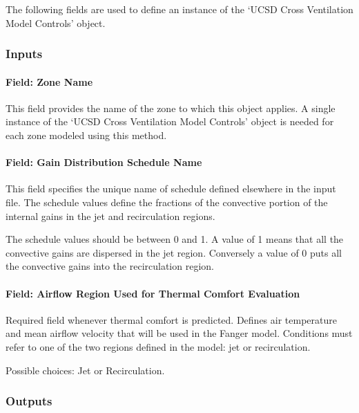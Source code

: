 The following fields are used to define an instance of the `UCSD Cross Ventilation Model Controls' object.

\subsubsection{Inputs}\label{inputs-9-018}

\paragraph{Field: Zone Name}\label{field-zone-name-5-004}

This field provides the name of the zone to which this object applies. A single instance of the `UCSD Cross Ventilation Model Controls' object is needed for each zone modeled using this method.

\paragraph{Field: Gain Distribution Schedule Name}\label{field-gain-distribution-schedule-name-1}

This field specifies the unique name of schedule defined elsewhere in the input file. The schedule values define the fractions of the convective portion of the internal gains in the jet and recirculation regions.

The schedule values should be between 0 and 1. A value of 1 means that all the convective gains are dispersed in the jet region. Conversely a value of 0 puts all the convective gains into the recirculation region.

\paragraph{Field: Airflow Region Used for Thermal Comfort Evaluation}\label{field-airflow-region-used-for-thermal-comfort-evaluation}

Required field whenever thermal comfort is predicted. Defines air temperature and mean airflow velocity that will be used in the Fanger model. Conditions must refer to one of the two regions defined in the model: jet or recirculation.

Possible choices: Jet or Recirculation.

\subsubsection{Outputs}


